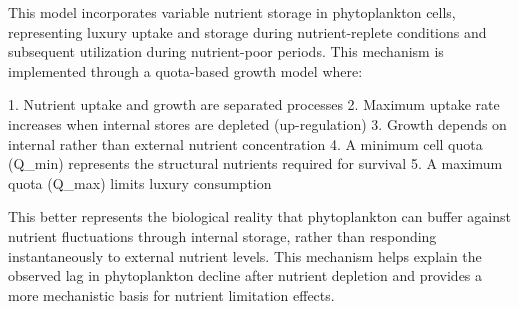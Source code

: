This model incorporates variable nutrient storage in phytoplankton cells, representing luxury uptake and storage during nutrient-replete conditions and subsequent utilization during nutrient-poor periods. This mechanism is implemented through a quota-based growth model where:

1. Nutrient uptake and growth are separated processes
2. Maximum uptake rate increases when internal stores are depleted (up-regulation)
3. Growth depends on internal rather than external nutrient concentration
4. A minimum cell quota (Q_min) represents the structural nutrients required for survival
5. A maximum quota (Q_max) limits luxury consumption

This better represents the biological reality that phytoplankton can buffer against nutrient fluctuations through internal storage, rather than responding instantaneously to external nutrient levels. This mechanism helps explain the observed lag in phytoplankton decline after nutrient depletion and provides a more mechanistic basis for nutrient limitation effects.
